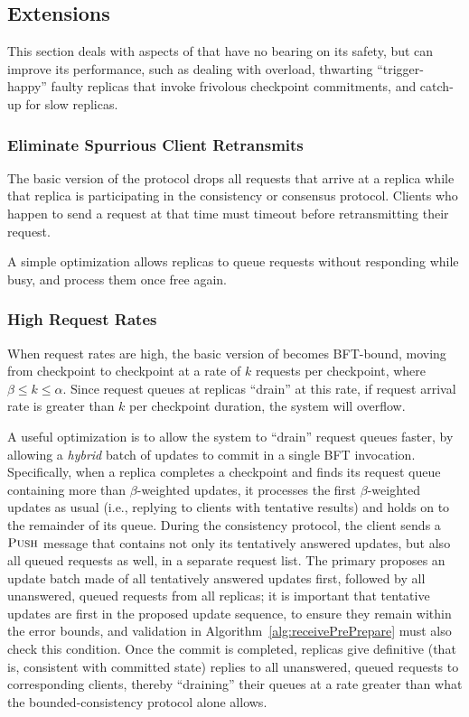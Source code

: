 \documentclass[twocolumn,10pt]{article}
\begin{document}
{\subsection{Extensions}

This section deals with aspects of \Sys that have no bearing on its
safety, but can improve its performance, such as dealing with overload, thwarting
``trigger-happy'' faulty replicas that invoke frivolous checkpoint
commitments, and catch-up for slow replicas.

\subsubsection{Eliminate Spurrious Client Retransmits}
The basic version of the protocol drops all requests that arrive at a
replica while that replica is participating in the consistency or
consensus protocol. Clients who happen to send a request at that time
must timeout before retransmitting their request.

A simple optimization allows replicas to queue requests without
responding while busy, and process them once free again.

\fi

\subsubsection{High Request Rates}
When request rates are high, the basic version of \Sys becomes
BFT-bound, moving from checkpoint to checkpoint at a rate of $k$
requests per checkpoint, where $\beta \leq k \leq \alpha$.  Since request queues at
replicas ``drain'' at this rate, if request arrival rate is greater than
$k$ per checkpoint duration, the system will overflow.

A useful optimization is to allow the system to ``drain'' request queues
faster, by allowing a \emph{hybrid} batch of updates to commit in a
single BFT invocation.  Specifically, when a replica completes a
checkpoint and finds its request queue containing more than
$\beta$-weighted updates, it processes the first $\beta$-weighted
updates as usual (i.e., replying to clients with tentative results) and
holds on to the remainder of its queue. During the consistency protocol,
the client sends a $\textsc{Push}$ message that contains not only its
tentatively answered updates, but also all queued requests as well, in a
separate request list.  The primary proposes an update batch made of all
tentatively answered updates first, followed by all unanswered, queued
requests from all replicas; it is important that tentative updates are
first in the proposed update sequence, to ensure they remain within the
error bounds, and validation in Algorithm~\ref{alg:receivePrePrepare} must also
check this condition.  Once the commit is completed, replicas give
definitive (that is, consistent with committed state) replies to all
unanswered, queued requests to corresponding clients, thereby
``draining'' their queues at a rate greater than what the
bounded-consistency protocol alone allows.


}
\end{document}
